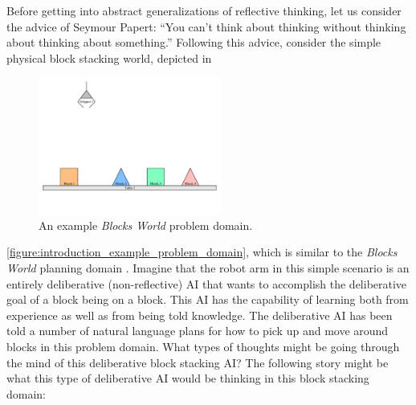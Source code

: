 Before getting into abstract generalizations of reflective thinking,
let us consider the advice of Seymour Papert: ``You can't think about
thinking without thinking about thinking about something.''  Following
this advice, consider the simple physical block stacking world,
depicted in
\begin{figure}
\includegraphics[width=6cm]{gfx/blocks_world_large-01}
  \caption[An example {\emph{Blocks World}} problem domain.]{An
    example {\emph{Blocks World}} problem domain.}
  \label{figure:introduction_example_problem_domain}
\end{figure}
{\autoref{figure:introduction_example_problem_domain}}, which is
similar to the {\emph{Blocks World}} planning domain
{\cite[]{winograd:1970}}.  Imagine that the robot arm in this simple
scenario is an entirely deliberative (non-reflective) AI that wants to
accomplish the deliberative goal of a block being on a block.  This AI
has the capability of learning both from experience as well as from
being told knowledge.  The deliberative AI has been told a number of
natural language plans for how to pick up and move around blocks in
this problem domain.  What types of thoughts might be going through
the mind of this deliberative block stacking AI?  The following story
might be what this type of deliberative AI would be thinking in this
block stacking domain:
